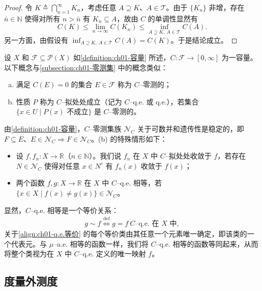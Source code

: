 \documentclass[../../main.tex]{subfiles}%
\begin{document}
\begin{proof}
令 $K\triangleq \bigcap_{n=1}^\infty K_n$，考虑任意 $A\supseteq K$、$A\in\mathcal{T}$。由于 $\{K_n\}$ 非增，存在 $\bar{n}\in\mathbb{N}$ 使得对所有 $n>\bar{n}$ 有 $K_n\subseteq A$，故由 $C$ 的单调性显然有
\[
C(K)\leqslant\lim_{n\to\infty}C(K_n)\leqslant\inf_{A\supseteq K,\ A\in\mathcal{T}}C(A).
\]
另一方面，由假设有 $\inf_{A\supseteq K,\ A\in\mathcal{T}}C(A)=C(K)$。于是结论成立。
\end{proof}

设 $X$ 和 $\mathcal{F}\subseteq\mathcal{P}(X)$ 如\cref{definition:ch01-容量} 所述，$C:\mathcal{F}\to[0,\infty]$ 为一容量。以下概念与\cref{subsection:ch01-零测集} 中的概念类似：
\begin{enumerate}[(a)]
\item 满足 $C(E)=0$ 的集合 $E\in\mathcal{F}$ 称为 $C$--零测的；
\item 性质 $P$ 称为 $C$--拟处处成立（记为 $C$--q.e. 或 q.e.），若集合 $\{x\in U\mid P(x)\text{ 不成立}\}$ 是 $C$--零测的。
\end{enumerate}

由\cref{definition:ch01-容量}，$C$--零测集族 $\mathcal{N}_C$ 关于可数并和遗传性是稳定的，即 $F\subseteq E$、$E\in\mathcal{N}_C\Rightarrow F\in\mathcal{N}_C$。(b) 的特殊情形如下：
\begin{itemize}
\item 设 $f,f_n:X\to\mathbb{R}$（$n\in\mathbb{N}$）。我们说 $f_n$ 在 $X$ 中 $C$--拟处处收敛于 $f$，若存在 $N\in\mathcal{N}_C$ 使得对任意 $x\in N^c$ 有 $f_n(x)$ 收敛于 $f(x)$；
\item 两个函数 $f,g:X\to\mathbb{R}$ 在 $X$ 中 $C$--q.e. 相等，若 $\{x\in X\mid f(x)\neq g(x)\}\in\mathcal{N}_C$。
\end{itemize}

显然，$C$--q.e. 相等是一个等价关系：
\begin{align}
g\sim f\overset{\mathrm{def}}{\Longleftrightarrow}g=f\ C\text{--q.e. 在 }X\text{ 中}, \label{align:ch01-q.e.等价}
\end{align}
关于\eqref{align:ch01-q.e.等价} 的每个等价类由其任意一个元素唯一确定，即该类的一个代表元。与 $\mu$--a.e. 相等的函数一样，我们将 $C$--q.e. 相等的函数等同起来，从而将整个类视为在 $X$ 中 $C$--q.e. 定义的唯一映射 $f$。

\subsection{度量外测度}\label{subsection:ch01-度量外测度}
\end{document}
